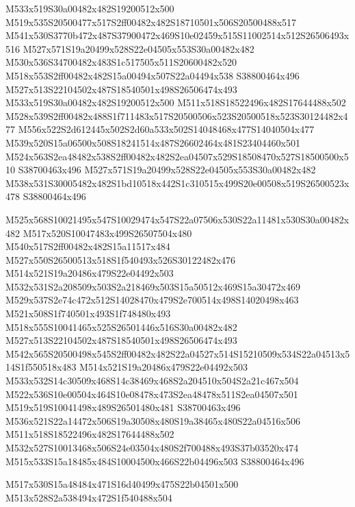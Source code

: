 \documentclass{article}
\begin{document}
\begin{multicols}{2}
M533x519S30a00482x482S19200512x500 M519x535S20500477x517S2ff00482x482S18710501x506S20500488x517 M541x530S3770b472x487S37900472x469S10e02459x515S11002514x512S26506493x516 M527x571S19a20499x528S22e04505x553S30a00482x482 M530x536S34700482x483S1c517505x511S20600482x520 M518x553S2ff00482x482S15a00494x507S22a04494x538 S38800464x496 M527x513S22104502x487S18540501x498S26506474x493 M533x519S30a00482x482S19200512x500 M511x518S18522496x482S17644488x502 M528x539S2ff00482x488S1f711483x517S20500506x523S20500518x523S30124482x477 M556x522S2d612445x502S2d60a533x502S14048468x477S14040504x477 M539x520S15a06500x508S18241514x487S26602464x481S23404460x501 M524x563S2ea48482x538S2ff00482x482S2ea04507x529S18508470x527S18500500x510 S38700463x496 M527x571S19a20499x528S22e04505x553S30a00482x482 M538x531S30005482x482S1bd10518x442S1c310515x499S20e00508x519S26500523x478 S38800464x496

M525x568S10021495x547S10029474x547S22a07506x530S22a11481x530S30a00482x482 M517x520S10047483x499S26507504x480 M540x517S2ff00482x482S15a11517x484 M527x550S26500513x518S1f540493x526S30122482x476 M514x521S19a20486x479S22e04492x503 M532x531S2a208509x503S2a218469x503S15a50512x469S15a30472x469 M529x537S2e74c472x512S14028470x479S2e700514x498S14020498x463 M521x508S1f740501x493S1f748480x493 M518x555S10041465x525S26501446x516S30a00482x482 M527x513S22104502x487S18540501x498S26506474x493 M542x565S20500498x545S2ff00482x482S22a04527x514S15210509x534S22a04513x514S1f550518x483 M514x521S19a20486x479S22e04492x503 M533x532S14c30509x468S14c38469x468S2a204510x504S2a21c467x504 M522x536S10e00504x464S10e08478x473S2ea48478x511S2ea04507x501 M519x519S10041498x489S26501480x481 S38700463x496 M536x521S22a14472x506S19a30508x480S19a38465x480S22a04516x506 M511x518S18522496x482S17644488x502 M532x527S10013468x506S24e03504x480S2f700488x493S37b03520x474 M515x533S15a18485x484S10004500x466S22b04496x503 S38800464x496

\begin{center}
M517x530S15a48484x471S16d40499x475S22b04501x500 M513x528S2a538494x472S1f540488x504 
\end{center}



\end{multicols}
\end{document}
